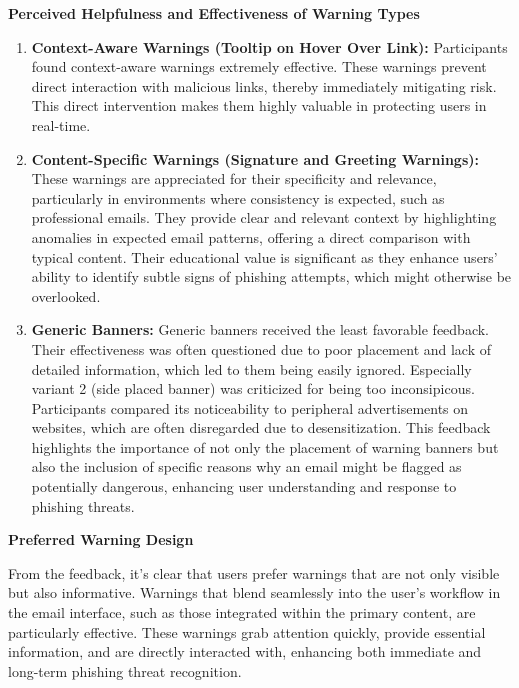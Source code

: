 \documentclass[
  a4paper,  %
  twoside,  %
  bibliography=totoc,
  headsepline,
  cleardoublepage=empty,
  parskip=half,
  draft=false
]{scrbook}
\begin{document}
\textbf{Perceived Helpfulness and Effectiveness of Warning Types}
\begin{enumerate}
    \item \textbf{Context-Aware Warnings (Tooltip on Hover Over Link):}
    Participants found context-aware warnings extremely effective. These warnings prevent direct interaction with malicious links, thereby immediately mitigating risk. This direct intervention makes them highly valuable in protecting users in real-time.
    \item \textbf{Content-Specific Warnings (Signature and Greeting Warnings):}
    These warnings are appreciated for their specificity and relevance, particularly in environments where consistency is expected, such as professional emails. They provide clear and relevant context by highlighting anomalies in expected email patterns, offering a direct comparison with typical content. Their educational value is significant as they enhance users' ability to identify subtle signs of phishing attempts, which might otherwise be overlooked.
    \item \textbf{Generic Banners:}
    Generic banners received the least favorable feedback. Their effectiveness was often questioned due to poor placement and lack of detailed information, which led to them being easily ignored. Especially variant 2 (side placed banner) was criticized for being too inconsipicous. Participants compared its noticeability to peripheral advertisements on websites, which are often disregarded due to desensitization. This feedback highlights the importance of not only the placement of warning banners but also the inclusion of specific reasons why an email might be flagged as potentially dangerous, enhancing user understanding and response to phishing threats.
\end{enumerate}

\textbf{Preferred Warning Design}

From the feedback, it's clear that users prefer warnings that are not only visible but also informative. Warnings that blend seamlessly into the user's workflow in the email interface, such as those integrated within the primary content, are particularly effective. These warnings grab attention quickly, provide essential information, and are directly interacted with, enhancing both immediate and long-term phishing threat recognition.
\end{document}
